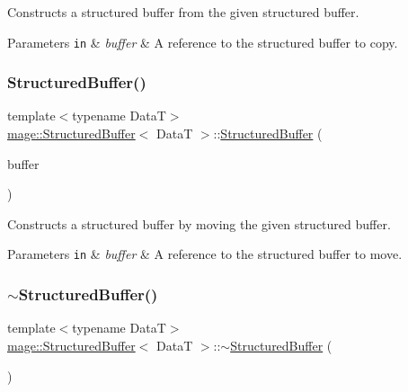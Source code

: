 Constructs a structured buffer from the given structured buffer.


\begin{DoxyParams}[1]{Parameters}
\mbox{\tt in}  & {\em buffer} & A reference to the structured buffer to copy. \\
\hline
\end{DoxyParams}
\hypertarget{structmage_1_1_structured_buffer_a455bd930f39f5fdf6af4f453694997da}{}\label{structmage_1_1_structured_buffer_a455bd930f39f5fdf6af4f453694997da} 
\subsubsection{\texorpdfstring{Structured\+Buffer()}{StructuredBuffer()}\hspace{0.1cm}{\footnotesize\ttfamily [4/4]}}
{\footnotesize\ttfamily template$<$typename DataT$>$ \\
\hyperlink{structmage_1_1_structured_buffer}{mage\+::\+Structured\+Buffer}$<$ DataT $>$\+::\hyperlink{structmage_1_1_structured_buffer}{Structured\+Buffer} (\begin{DoxyParamCaption}\item[{\hyperlink{structmage_1_1_structured_buffer}{Structured\+Buffer}$<$ DataT $>$ \&\&}]{buffer }\end{DoxyParamCaption})\hspace{0.3cm}{\ttfamily [default]}}

Constructs a structured buffer by moving the given structured buffer.


\begin{DoxyParams}[1]{Parameters}
\mbox{\tt in}  & {\em buffer} & A reference to the structured buffer to move. \\
\hline
\end{DoxyParams}
\hypertarget{structmage_1_1_structured_buffer_a02ab1d322e1aef0c608b85224b80dbcf}{}\label{structmage_1_1_structured_buffer_a02ab1d322e1aef0c608b85224b80dbcf} 
\subsubsection{\texorpdfstring{$\sim$\+Structured\+Buffer()}{~StructuredBuffer()}}
{\footnotesize\ttfamily template$<$typename DataT$>$ \\
\hyperlink{structmage_1_1_structured_buffer}{mage\+::\+Structured\+Buffer}$<$ DataT $>$\+::$\sim$\hyperlink{structmage_1_1_structured_buffer}{Structured\+Buffer} (\begin{DoxyParamCaption}{ }\end{DoxyParamCaption})\hspace{0.3cm}{\ttfamily [default]}}

